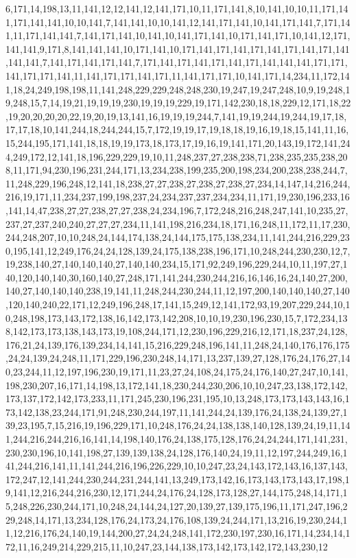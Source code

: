 6,171,14,198,13,11,141,12,12,141,12,141,171,10,11,171,141,8,10,141,10,10,11,171,141,171,141,141,10,10,141,7,141,141,10,10,141,12,141,171,141,10,141,171,141,7,171,141,11,171,141,141,7,141,171,141,10,141,10,141,171,141,10,171,141,171,10,141,12,171,141,141,9,171,8,141,141,141,10,171,141,10,171,141,171,141,171,141,171,141,171,141,141,141,7,141,171,141,171,141,7,171,141,171,141,171,141,171,141,141,141,171,171,141,171,171,141,11,141,171,171,141,171,11,141,171,171,10,141,171,14,234,11,172,141,18,24,249,198,198,11,141,248,229,229,248,248,230,19,247,19,247,248,10,9,19,248,19,248,15,7,14,19,21,19,19,19,230,19,19,19,229,19,171,142,230,18,18,229,12,171,18,22,19,20,20,20,20,22,19,20,19,13,141,16,19,19,19,244,7,141,19,19,244,19,244,19,17,18,17,17,18,10,141,244,18,244,244,15,7,172,19,19,17,19,18,18,19,16,19,18,15,141,11,16,15,244,195,171,141,18,18,19,19,173,18,173,17,19,16,19,141,171,20,143,19,172,141,244,249,172,12,141,18,196,229,229,19,10,11,248,237,27,238,238,71,238,235,235,238,208,11,171,94,230,196,231,244,171,13,234,238,199,235,200,198,234,200,238,238,244,7,11,248,229,196,248,12,141,18,238,27,27,238,27,238,27,238,27,234,14,147,14,216,244,216,19,171,11,234,237,199,198,237,24,234,237,237,234,234,11,171,19,230,196,233,16,141,14,47,238,27,27,238,27,27,238,24,234,196,7,172,248,216,248,247,141,10,235,27,237,27,237,240,240,27,27,27,234,11,141,198,216,234,18,171,16,248,11,172,11,17,230,244,248,207,10,10,248,24,144,174,138,24,144,175,175,138,234,11,141,244,216,229,230,195,141,12,249,176,24,24,128,139,24,175,138,238,196,171,10,248,244,230,230,12,7,19,238,140,27,140,140,140,27,140,140,234,15,171,92,249,196,229,244,10,11,197,27,140,120,140,140,30,160,140,27,248,171,141,244,230,244,216,16,146,16,24,140,27,200,140,27,140,140,140,238,19,141,11,248,244,230,244,11,12,197,200,140,140,140,27,140,120,140,240,22,171,12,249,196,248,17,141,15,249,12,141,172,93,19,207,229,244,10,10,248,198,173,143,172,138,16,142,173,142,208,10,10,19,230,196,230,15,7,172,234,138,142,173,173,138,143,173,19,108,244,171,12,230,196,229,216,12,171,18,237,24,128,176,21,24,139,176,139,234,14,141,15,216,229,248,196,141,11,248,24,140,176,176,175,24,24,139,24,248,11,171,229,196,230,248,14,171,13,237,139,27,128,176,24,176,27,140,23,244,11,12,197,196,230,19,171,11,23,27,24,108,24,175,24,176,140,27,247,10,141,198,230,207,16,171,14,198,13,172,141,18,230,244,230,206,10,10,247,23,138,172,142,173,137,172,142,173,233,11,171,245,230,196,231,195,10,13,248,173,173,143,143,16,173,142,138,23,244,171,91,248,230,244,197,11,141,244,24,139,176,24,138,24,139,27,139,23,195,7,15,216,19,196,229,171,10,248,176,24,24,138,138,140,128,139,24,19,11,141,244,216,244,216,16,141,14,198,140,176,24,138,175,128,176,24,24,244,171,141,231,230,230,196,10,141,198,27,139,139,138,24,128,176,140,24,19,11,12,197,244,249,16,141,244,216,141,11,141,244,216,196,226,229,10,10,247,23,24,143,172,143,16,137,143,172,247,12,141,244,230,244,231,244,141,13,249,173,142,16,173,143,173,143,17,198,19,141,12,216,244,216,230,12,171,244,24,176,24,128,173,128,27,144,175,248,14,171,15,248,226,230,244,171,10,248,24,144,24,127,20,139,27,139,175,196,11,171,247,196,229,248,14,171,13,234,128,176,24,173,24,176,108,139,24,244,171,13,216,19,230,244,11,12,216,176,24,140,19,144,200,27,24,24,248,141,172,230,197,230,16,171,14,234,14,172,11,16,249,214,229,215,11,10,247,23,144,138,173,142,173,142,172,143,230,12
